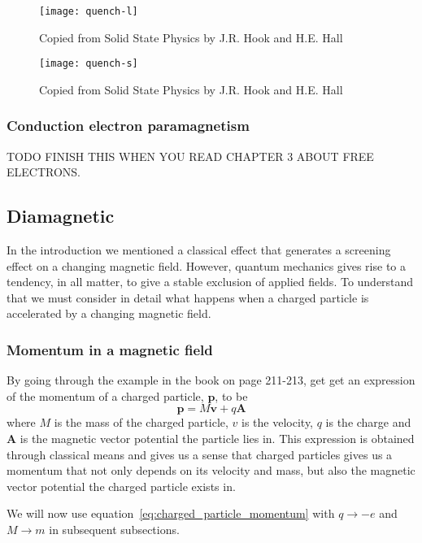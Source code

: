 \documentclass[11pt]{article}
\begin{document}
\begin{figure}[!ht]
	\centering
	\texttt{[image: quench-l]}
	\caption{Copied from Solid State Physics by J.R. Hook and H.E. Hall}
	\label{fig:quench-l}
\end{figure}

\begin{figure}[!ht]
	\centering
	\texttt{[image: quench-s]}
	\caption{Copied from Solid State Physics by J.R. Hook and H.E. Hall}
	\label{fig:quench-s}
\end{figure}

\newpage
\subsubsection{Conduction electron paramagnetism}
TODO
FINISH THIS WHEN YOU READ CHAPTER 3 ABOUT FREE ELECTRONS.


\newpage
\subsection{Diamagnetic}
In the introduction we mentioned a classical effect that generates a screening effect on a changing magnetic field. However, quantum mechanics gives rise to a tendency, in all matter, to give a stable exclusion of applied fields. To understand that we must consider in detail what happens when a charged particle is accelerated by a changing magnetic field.

\subsubsection{Momentum in a magnetic field}
By going through the example in the book on page 211-213, get get an expression of the momentum of a charged particle, $\pmb{p}$, to be
\begin{equation}
	\pmb{p} = M\pmb{v} + q\pmb{A}
	\label{eq:charged_particle_momentum}
\end{equation}
where $M$ is the mass of the charged particle, $v$ is the velocity, $q$ is the charge and $\pmb{A}$ is the magnetic vector potential the particle lies in. This expression is obtained through classical means and gives us a sense that charged particles gives us a momentum that not only depends on its velocity and mass, but also the magnetic vector potential the charged particle exists in.

We will now use equation~\ref{eq:charged_particle_momentum} with $q \to -e$ and $M \to m$ in subsequent subsections.
\end{document}
